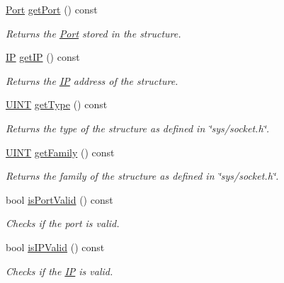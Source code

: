 \begin{DoxyCompactItemize}
\hyperlink{class_communication_1_1_port}{Port} \hyperlink{class_communication_1_1_socket_structure_a7be506680c04918818545f05f84680cb}{get\+Port} () const 
\begin{DoxyCompactList}\small\item\em Returns the \hyperlink{class_communication_1_1_port}{Port} stored in the structure. \end{DoxyCompactList}\item 
\hyperlink{class_communication_1_1_i_p}{I\+P} \hyperlink{class_communication_1_1_socket_structure_a67ef573033634fd974c791861dff84cc}{get\+I\+P} () const 
\begin{DoxyCompactList}\small\item\em Returns the \hyperlink{class_communication_1_1_i_p}{I\+P} address of the structure. \end{DoxyCompactList}\item 
\hyperlink{typedefs_8h_a2e2c38961834f28c06e17e074eb00bc7}{U\+I\+N\+T} \hyperlink{class_communication_1_1_socket_structure_accda20274761bc71c0bc142875aa676e}{get\+Type} () const 
\begin{DoxyCompactList}\small\item\em Returns the type of the structure as defined in \char`\"{}sys/socket.\+h\char`\"{}. \end{DoxyCompactList}\item 
\hyperlink{typedefs_8h_a2e2c38961834f28c06e17e074eb00bc7}{U\+I\+N\+T} \hyperlink{class_communication_1_1_socket_structure_a2175ee4dfb07e2f410348937f801a668}{get\+Family} () const 
\begin{DoxyCompactList}\small\item\em Returns the family of the structure as defined in \char`\"{}sys/socket.\+h\char`\"{}. \end{DoxyCompactList}\item 
bool \hyperlink{class_communication_1_1_socket_structure_aba551d9dec66414c7188eaf0a0e21940}{is\+Port\+Valid} () const 
\begin{DoxyCompactList}\small\item\em Checks if the port is valid. \end{DoxyCompactList}\item 
bool \hyperlink{class_communication_1_1_socket_structure_ab86892c3c0707022bc3012239e2928b8}{is\+I\+P\+Valid} () const 
\begin{DoxyCompactList}\small\item\em Checks if the \hyperlink{class_communication_1_1_i_p}{I\+P} is valid. \end{DoxyCompactList}\item 

\end{DoxyCompactItemize}
